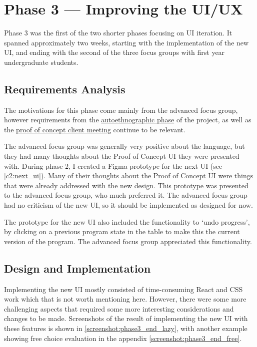 \chapter{Phase 3 --- Improving the UI/UX}
Phase 3 was the first of the two shorter phases focusing on UI iteration. It spanned approximately two weeks, starting with the implementation of the new UI, and ending with the second of the three focus groups with first year undergraduate students. 

\section{Requirements Analysis}
The motivations for this phase come mainly from the advanced focus group, however requirements from the \hyperref[sec:c1_autoethnography]{autoethnographic phase} of the project, as well as the \hyperref[eval:c1_client]{proof of concept client meeting} continue to be relevant. 

The advanced focus group was generally very positive about the language, but they had many thoughts about the Proof of Concept UI they were presented with. During phase 2, I created a Figma prototype for the next UI (see \ref{c2:next_ui}). Many of their thoughts about the Proof of Concept UI were things that were already addressed with the new design. This prototype was presented to the advanced focus group, who much preferred it. The advanced focus group had no criticism of the new UI, so it should be implemented as designed for now. 

The prototype for the new UI also included the functionality to `undo progress', by clicking on a previous program state in the table to make this the current version of the program. The advanced focus group appreciated this functionality. 




\section{Design and Implementation}
Implementing the new UI mostly consisted of time-consuming React and CSS work which that is not worth mentioning here. However, there were some more challenging aspects that required some more interesting considerations and changes to be made. Screenshots of the result of implementing the new UI with these features is shown in \ref{screenshot:phase3_end_lazy}, with another example showing free choice evaluation in the appendix \ref{screenshot:phase3_end_free}. 


